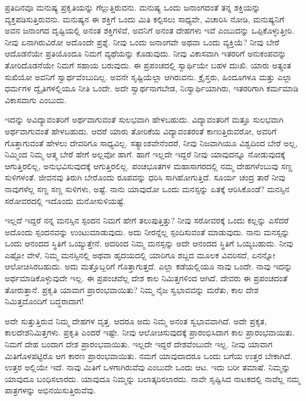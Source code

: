 ಪ್ರತಿದಿನವೂ ಮನುಷ್ಯ ಪ್ರಕೃತಿಯನ್ನು ಗೆಲ್ಲುತ್ತಿರುವನು. ಮನುಷ್ಯ ಒಂದು ಜನಾಂಗದಂತೆ ತನ್ನ ಶಕ್ತಿಯನ್ನು ವ್ಯಕ್ತಪಡಿಸುತ್ತಿರುವನು. ಮನುಷ್ಯನ ಈ ಶಕ್ತಿಗೆ ಒಂದು ಮಿತಿ ಕಲ್ಪಿಸಲು ಸಾಧ್ಯವೇ, ವಿಚಾರಿಸಿ ನೋಡಿ, ಮನುಷ್ಯನಿಗೆ ಅವನ ಜನಾಂಗದ ದೃಷ್ಟಿಯಲ್ಲಿ ಅನಂತ ಶಕ್ತಿಗಳಿವೆ, ಅವನಿಗೆ ಅನಂತ ದೇಹಗಳು ಇವೆ ಎಂಬುದನ್ನು ಒಪ್ಪಿಕೊಳ್ಳುತ್ತೀರಿ. ನೀವು ಏನಾಗಿರುವಿರೋ ಅದೊಂದೇ ಪ್ರಶ್ನೆ. ನೀವು ಒಂದು ಜನಾಂಗವೇ ಅಥವಾ ಒಂದು ವ್ಯಕ್ತಿಯೆ? ನೀವು ಬೇರೆ ಆದೊಡನೆಯೇ ಪ್ರತಿಯೊಂದೂ ನಿಮಗೆ ವ್ಯಥೆಯನ್ನು ಕೊಡುವುದು. ನೀವು ವಿಕಾಸವಾಗಿ ಇತರರಿಗೆ ಅನುಕಂಪವನ್ನು ತೋರಿದೊಡನೆಯೇ ನಿಮಗೆ ಸಹಾಯ ಬರುವುದು. ಈ ಪ್ರಪಂಚದಲ್ಲಿ ಸ್ವಾರ್ಥಿಯೇ ಬಹಳ ದುಃಖಿ. ಯಾರು ಅತ್ಯಂತ ಸುಖಿಯೋ ಅವನಿಗೆ ಸ್ವಾರ್ಥವೆಂಬುದಿಲ್ಲ. ಅವನೇ ಸೃಷ್ಟಿಯೆಲ್ಲಾ ಆಗಿರುವನು. ಕ್ರೈಸ್ತರು, ಹಿಂದೂಗಳೂ ಮತ್ತು ಎಲ್ಲಾ ಧರ್ಮಗಳ ದ್ವೈತಿಗಳಲ್ಲಿಯೂ ನೀತಿ ಒಂದೇ. ಅದೇ ಸ್ವಾರ್ಥನಾಗಬೇಡ, ನಿಃಸ್ವಾರ್ಥಿಯಾಗಿರು, ಇತರರಿಗಾಗಿ ಕರ್ಮಮಾಡಿ ವಿಕಾಸವಾಗು ಎಂಬುದು.

ಇದನ್ನು ಅವಿದ್ಯಾವಂತರಿಗೆ ಅರ್ಥವಾಗುವಂತೆ ಸುಲಭವಾಗಿ ಹೇಳಬಹುದು. ವಿದ್ಯಾವಂತರಿಗೆ ಮತ್ತೂ ಸುಲಭವಾಗಿ ಅರ್ಥವಾಗುವಂತೆ ಹೇಳಬಹುದು. ಆದರೆ ಯಾರು ತೋರಿಕೆಯ ವಿದ್ಯಾವಂತರಂತೆ ಕಾಣುತ್ತಿರುವರೋ, ಅವರಿಗೆ ಗೊತ್ತಾಗುವಂತೆ ಹೇಳಲು ದೇವರಿಗೂ ಸಾಧ್ಯವಿಲ್ಲ. ಸತ್ಯಾಂಶವೇನೆಂದರೆ, ನೀವು ನಿಜವಾಗಿಯೂ ವಿಶ್ವದಿಂದ ಬೇರೆ ಅಲ್ಲ, ನಿಮ್ಮಿಂದ ನಿಮ್ಮ ಆತ್ಮ ಬೇರೆ ಹೇಗೆ ಅಲ್ಲವೋ ಹಾಗೆ. ಹಾಗೆ ಇಲ್ಲದೇ ಇದ್ದರೆ ನೀವು ಯಾವುದನ್ನೂ ನೋಡುವುದಕ್ಕೆ ಆಗುತ್ತಿರಲಿಲ್ಲ, ಅನುಭವಿಸುವುದಕ್ಕೆ ಆಗುತ್ತಿರಲಿಲ್ಲ. ಪಂಚಭೂತಗಳ ಮಹಾಸಾಗರದಲ್ಲಿ ನಮ್ಮ ದೇಹಗಳೆಂಬುವು ಸಣ್ಣ ಸುಳಿಗಳಂತೆ. ಜೀವನವು ತಿರುಗಿ ಬೇರೊಂದು ರೂಪವನ್ನು ಧರಿಸಿ ಸಾಗಿಹೋಗುತ್ತಿದೆ. ಸೂರ್ಯ ಚಂದ್ರ ತಾರೆ ನೀವು ನಾವುಗಳೆಲ್ಲ ಸಣ್ಣ ಸಣ್ಣ ಸುಳಿಗಳು, ಅಷ್ಟೆ. ನಾನು ಯಾವುದೋ ಒಂದು ಮನಸ್ಸನ್ನು ಏತಕ್ಕೆ ಆರಿಸಿಕೊಂಡೆ? ಮನಸ್ಸಿನ ಸರೋವರದಲ್ಲಿ ಇದೊಂದು ಮನೋಸುಳಿಯಷ್ಟೆ.

ಇಲ್ಲದೆ ಇದ್ದರೆ ನನ್ನ ಮನಸ್ಸಿನ ಸ್ಪಂದನ ನಿಮಗೆ ಹೇಗೆ ತಲುಪುತ್ತಿತ್ತು? ನೀವು ಸರೋವರಕ್ಕೆ ಒಂದು ಕಲ್ಲನ್ನು ಎಸೆದರೆ ಅದೊಂದು ಸ್ಪಂದನವನ್ನು ಉಂಟುಮಾಡುವುದು. ಅದು ನೀರನ್ನೆಲ್ಲ ಸ್ಪಂದಿಸುವಂತೆ ಮಾಡುವುದು. ನಾನು ಮನಸ್ಸನ್ನು ಒಂದು ಆನಂದದ ಸ್ಥಿತಿಗೆ ಒಯ್ಯುತ್ತೇನೆ. ಅದರಿಂದ ನಿಮ್ಮ ಮನಸ್ಸನ್ನು ಅದೇ ಆನಂದದ ಸ್ಥಿತಿಗೆ ಒಯ್ಯಬಹುದು. ನೀವು ಎಷ್ಟೋ ವೇಳೆ, ನಿಮ್ಮ ಮನಸ್ಸಿನಲ್ಲಿ ಅಥವಾ ಹೃದಯದಲ್ಲಿ ಯಾರಿಗೂ ಶಬ್ದದ ಮೂಲಕ ವಿವರಿಸದೆ, ಏನನ್ನೋ ಆಲೋಚಿಸಿರಬಹುದು. ಅದು ಮತ್ತೊಬ್ಬರಿಗೆ ಗೊತ್ತಾಗುತ್ತದೆ. ಎಲ್ಲಾ ಕಡೆಯಲ್ಲಿಯೂ ನಾವು ಒಂದೇ. ನಾವು ಇದನ್ನು ಅರ್ಥಮಾಡಿಕೊಳ್ಳುವುದೇ ಇಲ್ಲ. ಈ ಪ್ರಪಂಚವೆಲ್ಲ ದೇಶ ಕಾಲ ನಿಮಿತ್ತಗಳಿಂದ ಆಗಿದೆ. ದೇವರು ಈ ಪ್ರಪಂಚದಂತೆ ತೋರುತ್ತಾನೆ. ಪ್ರಕೃತಿ ಯಾವಾಗ ಪ್ರಾರಂಭವಾಯಿತು? ನಿಮ್ಮ ನೈಜ ಸ್ವಭಾವವನ್ನು ಮರೆತು, ಕಾಲ ದೇಶ ನಿಮಿತ್ತದೊಂದಿಗೆ ಬದ್ಧರಾದಾಗ!

ಅದೇ ಸುತ್ತುತ್ತಿರುವ ನಿಮ್ಮ ದೇಹಗಳ ವೃತ್ತ. ಆದರೂ ಅದು ನಿಮ್ಮ ಅನಂತ ಸ್ವಭಾವವಾಗಿದೆ. ಅದೇ ಪ್ರಕೃತ, ಕಾಲದೇಶನಿಮಿತ್ತಗಳು. ಪ್ರಕೃತಿ ಎಂದರೆ ಇಷ್ಟೇ. ನೀವು ಆಲೋಚಿಸುವುದಕ್ಕೆ ಪ್ರಾರಂಭಿಸಿದಾಗ ಕಾಲ ಪ್ರಾರಂಭವಾಯಿತು. ನಿಮಗೆ ದೇಹ ಬಂದಾಗ ದೇಶ ಪ್ರಾರಂಭವಾಯಿತು. ಇಲ್ಲದೇ ಇದ್ದರೆ ದೇಶವೆಂಬುದೇ ಇಲ್ಲ. ನೀವು ಯಾವಾಗ ಮಿತಿಗೊಳಪಟ್ಟಿರೊ ಆಗ ಕಾರಣ ಪ್ರಾರಂಭವಾಯಿತು. ನಮಗೆ ಯಾವುದಾದರೂ ಒಂದು ಬಗೆಯ ಉತ್ತರ ಬೇಕಾಗಿದೆ. ಉತ್ತರ ಅಲ್ಲಿಯೇ ಇದೆ. ನಾವು ಮಿತಿಗೆ ಒಳಗಾಗಿರುವೆವು ಎಂಬುದೇ ಒಂದು ಆಟ. ಇದು ಬರೀ ತಮಾಷೆ. ನಿಮ್ಮನ್ನು ಯಾವುದೂ ಬಂಧಿಸಲಾರದು. ಯಾವುದೂ ನಿಮ್ಮನ್ನು ಬಲಾತ್ಕರಿಸಲಾರದು. ನಾವೇ ಸೃಷ್ಟಿಸಿದ ನಾಟಕದಲ್ಲಿ ನಾವೆಲ್ಲ ನಮ್ಮ ಪಾತ್ರಗಳನ್ನು ಅಭಿನಯಿಸುತ್ತಿರುವೆವು.

